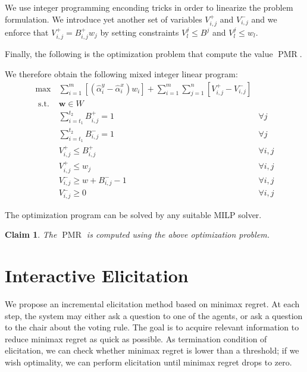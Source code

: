 \documentclass[12pt]{article}
\newcommand{\w}{\textbf{w}}%
\DeclareMathOperator{\PMR}{PMR}
\newtheorem{claim}{Claim}
\begin{document}
We use integer programming enconding tricks in order to linearize the problem formulation.
We introduce yet another set of variables  $V_{i,j}^{+} $  and $V_{i,j}^{-}$ %
and we enforce that $V_{i,j}^{+} = B^{+}_{i,j} w_j$ by setting constraints $V_{l}^{j} \leq B^j $ and $V_{l}^{j} \leq w_l$.
  

 Finally, the following is the optimization problem that compute the value $\PMR$.
 
We therefore obtain the following mixed integer linear program:
\begin{align}
\max & \sum_{i=1}^m  [(\hat{\alpha}_{i}^{y} - \hat{\alpha}_{i}^{x}) w_{i}] +
 \sum_{i=1}^m \sum_{j=1}^n  [V_{i,j}^{+} - V_{i,j}^{-}]\\
\text{ s.t. } & \w \in W  \\
& \sum_{i=t_{1}}^{t_{2}} B_{i,j}^{+} = 1 & \forall j \\
& \sum_{i=t_{1}}^{t_{2}} B_{i,j}^{-} = 1 & \forall j \\
& V_{i,j}^{+} \leq B_{i,j}^{+}  & \forall i,j \\
& V_{i,j}^{+} \leq w_j & \forall i,j \\
& V_{i,j}^{-} \geq w + B_{i,j}^{-} - 1 & \forall i,j \\
& V_{i,j}^{-} \geq 0 & \forall i,j
\end{align} 

The optimization program can be solved by any suitable MILP solver.

\begin{claim}
The $\PMR$ is computed using the above optimization problem.
\end{claim}

 
\section{Interactive Elicitation} \label{sec:elicit}

We propose an incremental elicitation method based on minimax regret.
At each step, the system may either ask a question to one of the agents, or ask a question to the chair about the voting rule. 
The goal is to acquire relevant information to reduce minimax regret as quick as possible.
As termination condition of elicitation, we can check whether minimax regret is lower than a threshold; if we wish optimality, we can perform elicitation until minimax regret drops to zero.
\end{document}
